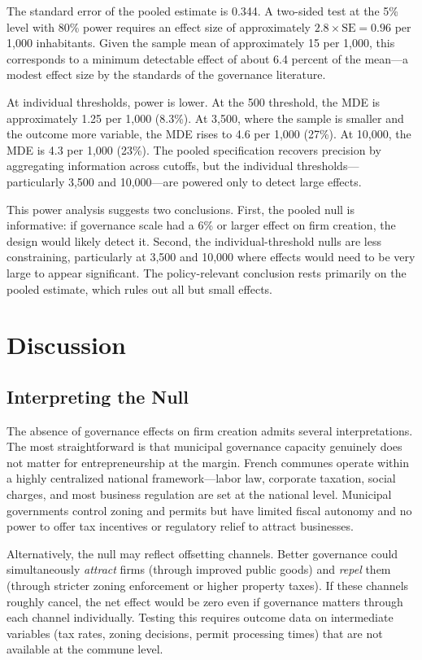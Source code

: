 \documentclass[12pt]{article}
\begin{document}
The standard error of the pooled estimate is 0.344. A two-sided test at the 5\% level with 80\% power requires an effect size of approximately $2.8 \times \text{SE} = 0.96$ per 1,000 inhabitants. Given the sample mean of approximately 15 per 1,000, this corresponds to a minimum detectable effect of about 6.4 percent of the mean---a modest effect size by the standards of the governance literature.

At individual thresholds, power is lower. At the 500 threshold, the MDE is approximately 1.25 per 1,000 (8.3\%). At 3,500, where the sample is smaller and the outcome more variable, the MDE rises to 4.6 per 1,000 (27\%). At 10,000, the MDE is 4.3 per 1,000 (23\%). The pooled specification recovers precision by aggregating information across cutoffs, but the individual thresholds---particularly 3,500 and 10,000---are powered only to detect large effects.

This power analysis suggests two conclusions. First, the pooled null is informative: if governance scale had a 6\% or larger effect on firm creation, the design would likely detect it. Second, the individual-threshold nulls are less constraining, particularly at 3,500 and 10,000 where effects would need to be very large to appear significant. The policy-relevant conclusion rests primarily on the pooled estimate, which rules out all but small effects.

\section{Discussion}

\subsection{Interpreting the Null}

The absence of governance effects on firm creation admits several interpretations. The most straightforward is that municipal governance capacity genuinely does not matter for entrepreneurship at the margin. French communes operate within a highly centralized national framework---labor law, corporate taxation, social charges, and most business regulation are set at the national level. Municipal governments control zoning and permits but have limited fiscal autonomy and no power to offer tax incentives or regulatory relief to attract businesses.

Alternatively, the null may reflect offsetting channels. Better governance could simultaneously \textit{attract} firms (through improved public goods) and \textit{repel} them (through stricter zoning enforcement or higher property taxes). If these channels roughly cancel, the net effect would be zero even if governance matters through each channel individually. Testing this requires outcome data on intermediate variables (tax rates, zoning decisions, permit processing times) that are not available at the commune level.
\end{document}
